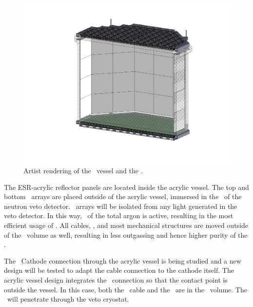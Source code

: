 \begin{figure}[!thbp]
\centering
\includegraphics[width=\columnwidth]{./Figures/TPC-acrylic-vessel-design.PDF}
\caption[Artist rendering of the \PMMA\ vessel and the \TPC]{Artist rendering of the \PMMA\ vessel and the \TPC.}
\label{fig:TPC_acrylic}
\end{figure}

The ESR-acrylic reflector panels are located inside the acrylic vessel. The top and bottom \DSkPdm\ arrays are placed outside of the acrylic vessel, immersed in the \AAr\ of the neutron veto detector. \DSkPdm\ arrays will be isolated from any light generated in the veto detector.  In this way, \DSkActiveMassRatio\ of the total argon is active, resulting in the most efficient usage of \UAr. All cables, \HVFTs, and most mechanical structures are moved outside of the \UAr\ volume as well, resulting in less outgassing and hence higher purity of the \UAr. 

The \HV\ Cathode connection through the acrylic vessel is being studied and a new design will be tested to adapt the cable connection to the cathode itself. The acrylic vessel design integrates the \HV\ connection so that the contact point is outside the vessel. In this case, both the \HV\ cable and the \HVFT\ are in the \AAr\ volume. The \HVFT\ will penetrate through the veto cryostat.

